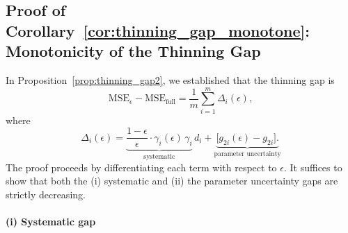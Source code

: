\documentclass[11pt]{article}
\newcommand{\msethin}{\mathrm{MSE}_{\epsilon}}
\newcommand{\msefull}{\mathrm{MSE}_{\mathrm{full}}}
\theoremstyle{plain}
\theoremstyle{definition}
\theoremstyle{remark}
\begin{document}

\subsection{Proof of Corollary~\ref{cor:thinning_gap_monotone}: Monotonicity of the Thinning Gap}
\label{app:thinning_gap_monotone}

In Proposition~\ref{prop:thinning_gap2}, we established that the thinning gap is
\[\msethin - \msefull = \frac{1}{m} \sum_{i=1}^m \Delta_i(\epsilon),\]
where
\[\Delta_i(\epsilon) = \underbrace{\frac{1-\epsilon}{\epsilon} \cdot \gamma_i(\epsilon) \, \gamma_i}_{\text{systematic}}\, d_i + \underbrace{\big[g_{2i}(\epsilon) - g_{2i}\big].}_{\text{parameter uncertainty}}\]
The proof proceeds by differentiating each term with respect to $\epsilon$. It suffices to show that both the (i) systematic and (ii) the parameter uncertainty gaps are strictly decreasing.


\paragraph{(i) Systematic gap}
\end{document}
